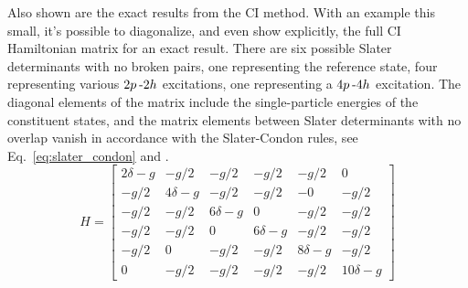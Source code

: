 \documentclass[thesis.tex]{subfiles}
\begin{document}
Also shown are the exact results from the CI method.  With an example this small, it's possible to diagonalize, and even show explicitly, the full CI Hamiltonian matrix for an exact result.  There are six possible Slater determinants with no broken pairs, one representing the reference state, four representing various $2p\hspace{2pt}\text{-}2h$ excitations, one representing a $4p\hspace{2pt}\text{-}4h$ excitation.  The diagonal elements of the matrix include the single-particle energies of the constituent states, and the matrix elements between Slater determinants with no overlap vanish in accordance with the Slater-Condon rules, see Eq.\ \eqref{eq:slater_condon} and \cite{SLATER1929,CONDON1930}.
\begin{equation}
  H = \begin{bmatrix}
    2\delta -g & -g/2 & -g/2 & -g/2 & -g/2 & 0 \\ -g/2 & 4\delta -g &
    -g/2 & -g/2 & -0 & -g/2 \\ -g/2 & -g/2 & 6\delta -g & 0 & -g/2 &
    -g/2 \\ -g/2 & -g/2 & 0 & 6\delta-g & -g/2 & -g/2 \\ -g/2 & 0 & -g/2
    & -g/2 & 8\delta-g & -g/2 \\ 0 & -g/2 & -g/2 & -g/2 & -g/2 &
    10\delta -g
  \end{bmatrix}
\end{equation}
\end{document}
